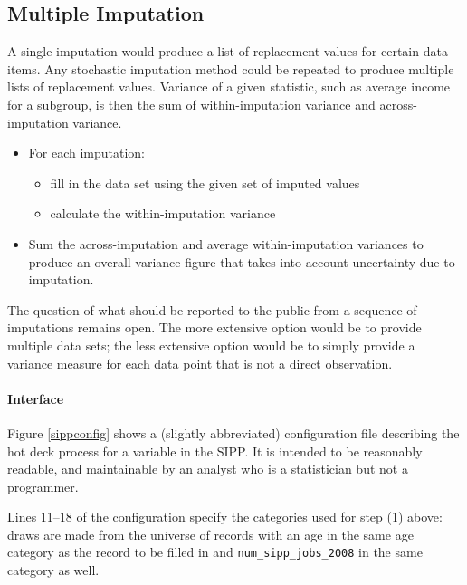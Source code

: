 \documentclass{article}
\def\tighten{ \setlength{\itemsep}{1pt}
    \setlength{\parskip}{0pt}}
\begin{document}
\subsection{Multiple Imputation}
A single imputation would produce a list of replacement
values for certain data items. Any stochastic imputation method could be repeated
to produce multiple lists of replacement values. Variance of a given statistic,
such as average income for a subgroup, is then the sum of within-imputation variance and
across-imputation variance.

\begin{itemize}
\tighten
\item For each imputation:
    \begin{itemize}
\tighten
    \item fill in the data set using the given set of imputed values
    \item calculate the within-imputation variance
    \end{itemize}
\item Sum the across-imputation and average within-imputation variances to
produce an overall variance figure that takes into account uncertainty due to imputation.
\end{itemize}

The question of what should be reported to the public from a sequence of imputations
remains open. The more extensive option would be to provide multiple data sets; the less
extensive option would be to simply provide a variance measure for each data point that
is not a direct observation.

        \paragraph{Interface} Figure \ref{sippconfig} shows a (slightly abbreviated)
        configuration file describing the hot deck process for a variable in the SIPP.
        It is intended to be reasonably readable, and maintainable by an analyst who is
        a statistician but not a programmer.

        Lines 11--18 of the configuration specify the
        categories used for step (1) above: draws are made from the universe of records with an
        age in the same age category as the record to be filled in and {\tt num\_sipp\_jobs\_2008} in the same
        category as well.
\end{document}
